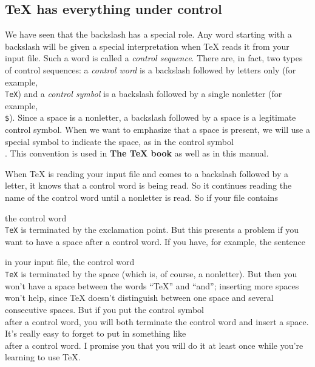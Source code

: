 \subsection{\TeX{} has everything under control} 
 
We have seen that the backslash has a special role. Any word 
starting with a backslash will be given a special interpretation 
when \TeX{} reads it from your input file. Such a word is called 
a {\sl control sequence}. There are, in fact, two types of 
control sequences: a {\sl control word\/} is a backslash followed 
by letters only (for example, {\tt \\TeX}) and a {\sl control 
symbol\/} is a backslash followed by a single nonletter (for 
example, {\tt \\\$})\null. Since a space is a nonletter, a 
backslash followed by a space is a legitimate control symbol. 
When we want to emphasize that a space is present, we will use a 
special symbol {\tt\sp} to indicate the space, as in the control 
symbol {\tt\\\sp}.  This convention is used in {\bf The \TeX 
book} as well as in this manual. 
 
When \TeX{} is reading your input file and comes to a backslash 
followed by a letter, it knows that a control word is being 
read. So it continues reading the name of the control word until 
a nonletter is read. So if your file contains 
 
 
\noindent 
the control word {\tt \\TeX} is terminated by the exclamation 
point. But this presents a problem if you want to have a space 
after a control word. If you have, for example, the sentence 
 
 
\noindent 
in your input file, the control word {\tt\\TeX} is terminated by 
the space (which is, of course, a nonletter). But then you won't 
have a space between the words ``\TeX{}'' and ``and''; inserting 
more spaces won't help, since \TeX{} doesn't distinguish between 
one space and several consecutive spaces. But if you put the 
control symbol {\tt\\\sp} after a control word, you will both 
terminate the control word and insert a space. It's really easy 
to forget to put in something like {\tt\\\sp} after a control 
word. I promise you that you will do it at least once while 
you're learning to use \TeX\null. 
 
